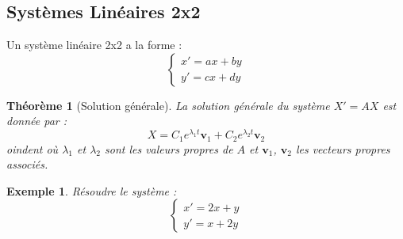 \documentclass[12pt]{article}
\newtheorem{theorem}{Théorème}[section]
\newtheorem{example}{Exemple}[section]
\begin{document}
\subsection{Systèmes Linéaires 2x2}
\begin{myequation}
Un système linéaire 2x2 a la forme :
\[
\begin{cases}
    x' = a x + b y \\
    y' = c x + d y
\end{cases}
\]
\end{myequation}

\begin{theorem}[Solution générale]
La solution générale du système $X' = A X$ est donnée par :
\[
X = C_1 e^{\lambda_1 t} \mathbf{v}_1 + C_2 e^{\lambda_2 t} \mathbf{v}_2
\]
oindent où $\lambda_1$ et $\lambda_2$ sont les valeurs propres de $A$ et $\mathbf{v}_1$, $\mathbf{v}_2$ les vecteurs propres associés.
\end{theorem}

\begin{example}
Résoudre le système :
\[
\begin{cases}
    x' = 2x + y \\
    y' = x + 2y
\end{cases}
\]
\end{example}
\end{document}
